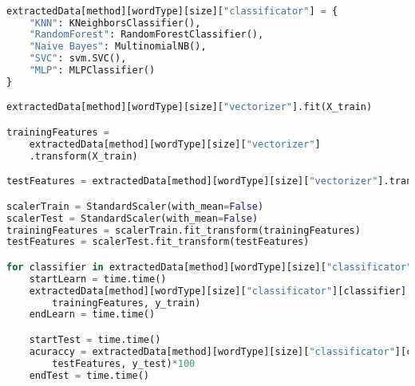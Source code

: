 \begin{lstlisting}[language=Python, caption={Główna pętla programu iterująca po wszystkich badanych metodach i wykonująca na nich pomiary}, captionpos=b, frame=single]

extractedData[method][wordType][size]["classificator"] = {
    "KNN": KNeighborsClassifier(),
    "RandomForest": RandomForestClassifier(),
    "Naive Bayes": MultinomialNB(),
    "SVC": svm.SVC(),
    "MLP": MLPClassifier()
}

extractedData[method][wordType][size]["vectorizer"].fit(X_train)

trainingFeatures = 
    extractedData[method][wordType][size]["vectorizer"]
    .transform(X_train)

testFeatures = extractedData[method][wordType][size]["vectorizer"].transform(X_test)

scalerTrain = StandardScaler(with_mean=False)
scalerTest = StandardScaler(with_mean=False)
trainingFeatures = scalerTrain.fit_transform(trainingFeatures)
testFeatures = scalerTest.fit_transform(testFeatures)

for classifier in extractedData[method][wordType][size]["classificator"].keys():
    startLearn = time.time()
    extractedData[method][wordType][size]["classificator"][classifier].fit(
        trainingFeatures, y_train)
    endLearn = time.time()

    startTest = time.time()
    acuraccy = extractedData[method][wordType][size]["classificator"][classifier].score(
        testFeatures, y_test)*100
    endTest = time.time()
\end{lstlisting}